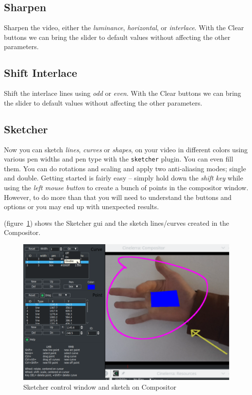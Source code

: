 \subsection{Sharpen}%
\label{sub:Sharpen}

Sharpen the video, either the \textit{luminance}, \textit{horizontal}, or \textit{interlace}. With the Clear buttons we can bring the slider to default values without affecting the other parameters.

\subsection{Shift Interlace}%
\label{sub:shift_interlace}

Shift the interlace lines using \textit{odd} or \textit{even}. With the Clear buttons we can bring the slider to default values without affecting the other parameters.

\subsection{Sketcher}%
\label{sub:Sketcher}

Now you can sketch \textit{lines}, \textit{curves} or \textit{shapes}, on your video in different colors using various pen widths and pen type with the \texttt{sketcher} plugin. You can even fill them. You can do rotations and scaling and apply two anti-aliasing modes; single and double. Getting started is fairly easy -- simply hold down the \textit{shift key} while using the \textit{left mouse button} to create a bunch of points in the compositor window. However, to do more than that you will need to understand the buttons and options or you may end up with unexpected results.

(figure~\ref{fig:sketcher}) shows the Sketcher gui and the sketch lines/curves created in the Compositor.

\begin{figure}[hbtp]
    \centering
    \includegraphics[width=1.0\linewidth]{images/sketcher.png}
    \caption{Sketcher control window and sketch on Compositor}
    \label{fig:sketcher}
\end{figure}

